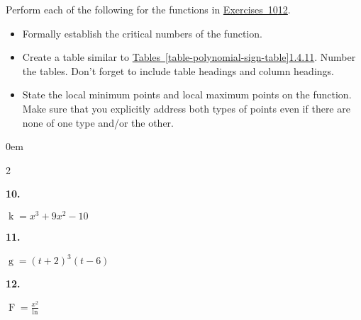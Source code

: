 \documentclass[12pt,]{book}
\theoremstyle{plain}
\theoremstyle{definition}
\numberwithin{equation}{section}
\newenvironment{exercisegroup}%
{\medskip\noindent}%
{\par\bigskip}%
\newlength{\exercisegroupindent}%
\newlength{\exercisegroupitemwidth}%
\newenvironment{exercisegrouplist}%
{\vspace{-\partopsep}%
\begin{adjustwidth}{\exercisegroupindent}{0em}}%
{\end{adjustwidth}%
\vspace{-\partopsep}%
\vspace{\baselineskip}}%
\newenvironment{exercisegroupbycol}[1]%
{\begin{exercisegrouplist}%
\vspace{-\multicolsep}%
\begin{multicols}{#1}%
\setlength{\parindent}{0em}%
\setlength{\exercisegroupitemwidth}{\linewidth}}%
{\end{multicols}%
\vspace{-\multicolsep}%
\end{exercisegrouplist}}%
\newenvironment{exercisegroupitem}[1]%
{\begin{minipage}[t]{\exercisegroupitemwidth}
\vspace{0pt}%
{\bfseries#1}%
\rule{0pt}{\baselineskip}}{\strut%
\end{minipage}%
\hspace{\columnsep}}%
\providecommand\phantomsection{}
\newcommand{\fe}[2]{\mathop{{#1}{\left(#2\right)}}}
\begin{document}
\begin{exercisegroup}%
Perform each of the following for the functions in \hyperref[exercise-make-sign-table-first]{Exercises~10}\textendash{}\hyperref[exercise-make-sign-table-last]{12}.%
\begin{itemize}[label=\textbullet]
\item{}Formally establish the critical numbers of the function.\item{}Create a table similar to \hyperref[table-polynomial-sign-table]{Tables~\ref*{table-polynomial-sign-table}}\textendash{}\hyperref[table-trient-rational-sign-table]{1.4.11}. Number the tables.  Don't forget to include table headings and column headings.\item{}State the local minimum points and local maximum points on the function.  Make sure that you explicitly address both types of points even if there are none of one type and/or the other.\end{itemize}
\par
\begin{exercisegroupbycol}{2}%
\begin{exercisegroupitem}{10. }\phantomsection\hypertarget{exercise-make-sign-table-first}{\null}
\(\fe{k}{x}=x^3+9x^2-10\)%
\end{exercisegroupitem}%
\par%
\begin{exercisegroupitem}{11. }\phantomsection\hypertarget{exercise-31}{\null}
\(\fe{g}{t}=(t+2)^3(t-6)\)%
\end{exercisegroupitem}%
\par%
\begin{exercisegroupitem}{12. }\phantomsection\hypertarget{exercise-make-sign-table-last}{\null}
\(\fe{F}{x}=\frac{x^2}{\fe{\ln}{x}}\)%
\end{exercisegroupitem}%
\par%
\end{exercisegroupbycol}%
\end{exercisegroup}%
\end{document}
